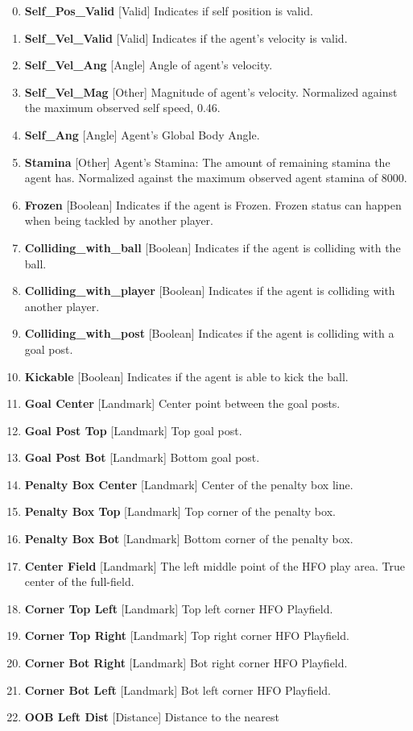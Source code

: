 \documentclass[12pt]{article}
\def\itemrange#1{%
\addtocounter{enumi}{1}%
\edef\labelenumi{\theenumi--\noexpand\theenumi}%
\addtocounter{enumi}{-1}%
\addtocounter{enumi}{#1}%
\item
\def\labelenumi{\theenumi}}
\renewcommand*{\labelenumi}{\theenumi}
\begin{document}
\begin{enumerate}
\setcounter{enumi}{-1}
  \item{\textbf{Self\_Pos\_Valid} [Valid] Indicates if self position is valid.}
  \item{\textbf{Self\_Vel\_Valid} [Valid] Indicates if the agent's velocity is valid.}
  \itemrange{1}{\textbf{Self\_Vel\_Ang} [Angle] Angle of agent's velocity.}
  \item{\textbf{Self\_Vel\_Mag} [Other] Magnitude of agent's
    velocity. Normalized against the maximum observed self speed,
    0.46.}
  \itemrange{1}{\textbf{Self\_Ang} [Angle] Agent's Global Body Angle.}
  \item{\textbf{Stamina} [Other] Agent's Stamina: The amount of remaining stamina the
    agent has. Normalized against the maximum observed agent stamina
    of 8000.}
  \item{\textbf{Frozen} [Boolean] Indicates if the agent is Frozen. Frozen status can
    happen when being tackled by another player.}
  \item{\textbf{Colliding\_with\_ball} [Boolean] Indicates if the agent
    is colliding with the ball.}
  \item{\textbf{Colliding\_with\_player} [Boolean] Indicates if the agent
    is colliding with another player.}
  \item{\textbf{Colliding\_with\_post} [Boolean] Indicates if the agent
    is colliding with a goal post.}
  \item{\textbf{Kickable} [Boolean] Indicates if the agent is able to
    kick the ball.}
  \itemrange{2}{\textbf{Goal Center} [Landmark] Center point between the goal posts.}
  \itemrange{2}{\textbf{Goal Post Top} [Landmark] Top goal post.}
  \itemrange{2}{\textbf{Goal Post Bot} [Landmark] Bottom goal post.}
  \itemrange{2}{\textbf{Penalty Box Center} [Landmark] Center of the penalty box line.}
  \itemrange{2}{\textbf{Penalty Box Top} [Landmark] Top corner of the penalty box.}
  \itemrange{2}{\textbf{Penalty Box Bot} [Landmark] Bottom corner of the penalty box.}
  \itemrange{2}{\textbf{Center Field} [Landmark] The left middle point of the
    HFO play area. True center of the full-field.}
  \itemrange{2}{\textbf{Corner Top Left} [Landmark] Top left corner HFO Playfield.}
  \itemrange{2}{\textbf{Corner Top Right} [Landmark] Top right corner HFO Playfield.}
  \itemrange{2}{\textbf{Corner Bot Right} [Landmark] Bot right corner HFO Playfield.}
  \itemrange{2}{\textbf{Corner Bot Left} [Landmark] Bot left corner HFO Playfield.}
  \item{\textbf{OOB Left Dist} [Distance] Distance to the nearest
}
\end{enumerate}
\end{document}
